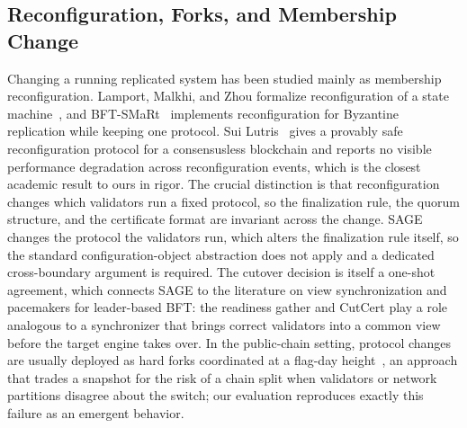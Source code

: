 \documentclass[journal]{IEEEtran}
\theoremstyle{remark}
\begin{document}
\subsection{Reconfiguration, Forks, and Membership Change}
Changing a running replicated system has been studied mainly as membership reconfiguration.
Lamport, Malkhi, and Zhou formalize reconfiguration of a state machine~\cite{reconfig}, and
BFT-SMaRt~\cite{bftsmart} implements reconfiguration for Byzantine replication while keeping
one protocol. Sui Lutris~\cite{suilutris} gives a provably safe reconfiguration protocol for a
consensusless blockchain and reports no visible performance degradation across reconfiguration
events, which is the closest academic result to ours in rigor. The crucial distinction is that
reconfiguration changes which validators run a fixed protocol, so the finalization rule, the
quorum structure, and the certificate format are invariant across the change. SAGE changes the
protocol the validators run, which alters the finalization rule itself, so the standard
configuration-object abstraction does not apply and a dedicated cross-boundary argument is
required. The cutover decision is itself a one-shot agreement, which connects SAGE to the
literature on view synchronization and pacemakers for leader-based BFT: the readiness gather and
CutCert play a role analogous to a synchronizer that brings correct validators into a common
view before the target engine takes over. In the public-chain setting, protocol changes are
usually deployed as hard forks coordinated at a flag-day height~\cite{tendermint,bitcoin}, an
approach that trades a snapshot for the risk of a chain split when validators or network
partitions disagree about the switch; our evaluation reproduces exactly this failure as an
emergent behavior.
\end{document}
